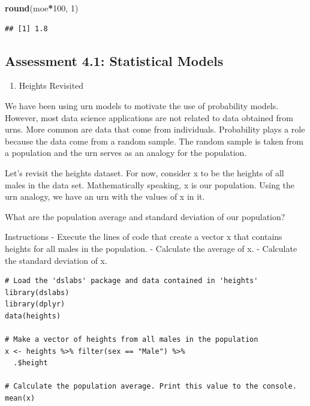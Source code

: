 \documentclass[
]{article}
\newenvironment{Shaded}{\begin{snugshade}}{\end{snugshade}}
\newcommand{\DecValTok}[1]{\textcolor[rgb]{0.00,0.00,0.81}{#1}}
\newcommand{\KeywordTok}[1]{\textcolor[rgb]{0.13,0.29,0.53}{\textbf{#1}}}
\newcommand{\NormalTok}[1]{#1}
\newcommand{\OperatorTok}[1]{\textcolor[rgb]{0.81,0.36,0.00}{\textbf{#1}}}
\providecommand{\tightlist}{%
  \setlength{\itemsep}{0pt}\setlength{\parskip}{0pt}}
\begin{document}
\begin{Shaded}
\begin{Highlighting}[]
\KeywordTok{round}\NormalTok{(moe}\OperatorTok{*}\DecValTok{100}\NormalTok{, }\DecValTok{1}\NormalTok{)}
\end{Highlighting}
\end{Shaded}

\begin{verbatim}
## [1] 1.8
\end{verbatim}

\hypertarget{assessment-4.1-statistical-models}{%
\subsection{Assessment 4.1: Statistical
Models}\label{assessment-4.1-statistical-models}}

\begin{enumerate}
\def\labelenumi{\arabic{enumi}.}
\tightlist
\item
  Heights Revisited
\end{enumerate}

We have been using urn models to motivate the use of probability models.
However, most data science applications are not related to data obtained
from urns. More common are data that come from individuals. Probability
plays a role because the data come from a random sample. The random
sample is taken from a population and the urn serves as an analogy for
the population.

Let's revisit the heights dataset. For now, consider x to be the heights
of all males in the data set. Mathematically speaking, x is our
population. Using the urn analogy, we have an urn with the values of x
in it.

What are the population average and standard deviation of our
population?

Instructions - Execute the lines of code that create a vector x that
contains heights for all males in the population. - Calculate the
average of x. - Calculate the standard deviation of x.

\begin{verbatim}
# Load the 'dslabs' package and data contained in 'heights'
library(dslabs)
library(dplyr)
data(heights)

# Make a vector of heights from all males in the population
x <- heights %>% filter(sex == "Male") %>%
  .$height

# Calculate the population average. Print this value to the console.
mean(x)
\end{verbatim}
\end{document}
